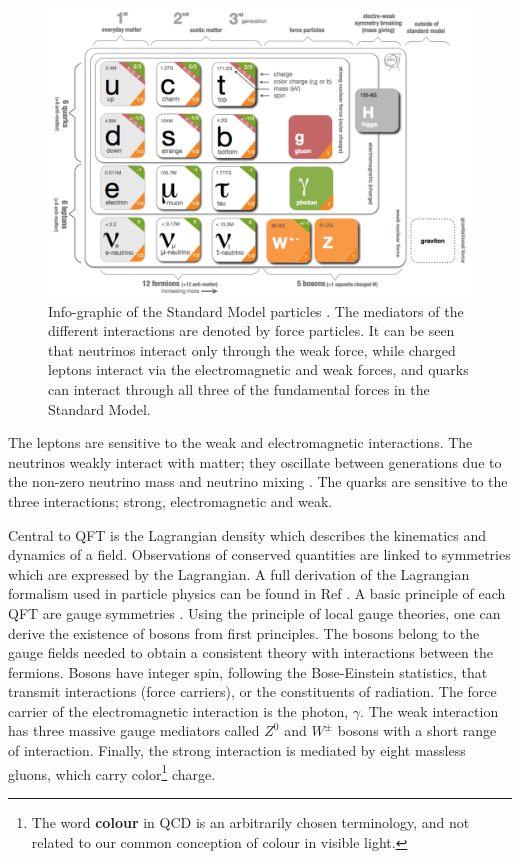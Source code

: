 \begin{figure}[htb!]
\includegraphics[width=\textwidth]{images/2-LHC-ATLAS/SM-infographic.png}
\caption{Info-graphic of the Standard Model particles \cite{david_galbraith_ux_2012}. The mediators of the different interactions are denoted by force particles. It can be seen that neutrinos interact only through the weak force, while charged leptons interact via the electromagnetic and weak forces, and quarks can interact through all three of the fundamental forces in the Standard Model.}
\label{fig: sm-infographic}
\end{figure}

The leptons are sensitive to the weak and electromagnetic interactions. The neutrinos weakly interact with matter; they oscillate between generations due to the non-zero neutrino mass and neutrino mixing \cite{Bilenky_1999}. The quarks are sensitive to the three interactions; strong, electromagnetic and weak. 

Central to QFT is the Lagrangian density which describes the kinematics and dynamics of a field. Observations of conserved quantities are linked to symmetries which are expressed by the Lagrangian. A full derivation of the Lagrangian formalism used in particle physics can be found in Ref \cite{gauge-theories}. A basic principle of each QFT are gauge symmetries \cite{bailin1993introduction}. Using the principle of local gauge theories, one can derive the existence of bosons from first principles. The bosons belong to the gauge fields needed to obtain a consistent theory with interactions between the fermions. Bosons have integer spin, following the Bose-Einstein statistics, that transmit interactions (force carriers), or the constituents of radiation. The force carrier of the electromagnetic interaction is the photon, $\gamma$. The weak interaction has three massive gauge mediators called $Z^{0}$ and $W^{\pm}$ bosons with a short range of interaction. Finally, the strong interaction is mediated by eight massless gluons, which carry color\footnote{The word \textbf{colour} in QCD is an arbitrarily chosen terminology, and not related to our common conception of colour in visible light.} charge. 


